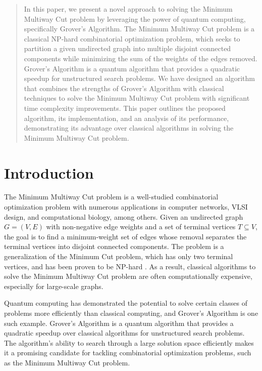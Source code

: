 \begin{abstract}
In this paper, we present a novel approach to solving the Minimum Multiway Cut problem by leveraging the power of quantum computing, specifically Grover's Algorithm. The Minimum Multiway Cut problem is a classical NP-hard combinatorial optimization problem, which seeks to partition a given undirected graph into multiple disjoint connected components while minimizing the sum of the weights of the edges removed. Grover's Algorithm is a quantum algorithm that provides a quadratic speedup for unstructured search problems. We have designed an algorithm that combines the strengths of Grover's Algorithm with classical techniques to solve the Minimum Multiway Cut problem with significant time complexity improvements. This paper outlines the proposed algorithm, its implementation, and an analysis of its performance, demonstrating its advantage over classical algorithms in solving the Minimum Multiway Cut problem.

\end{abstract}

\section{Introduction}
The Minimum Multiway Cut problem is a well-studied combinatorial optimization problem with numerous applications in computer networks, VLSI design, and computational biology, among others. Given an undirected graph $G=(V,E)$ with non-negative edge weights and a set of terminal vertices $T \subseteq V$, the goal is to find a minimum-weight set of edges whose removal separates the terminal vertices into disjoint connected components. The problem is a generalization of the Minimum Cut problem, which has only two terminal vertices, and has been proven to be NP-hard \cite{dahlhaus1994complexity}. As a result, classical algorithms to solve the Minimum Multiway Cut problem are often computationally expensive, especially for large-scale graphs.

Quantum computing has demonstrated the potential to solve certain classes of problems more efficiently than classical computing, and Grover's Algorithm \cite{grover1996fast} is one such example. Grover's Algorithm is a quantum algorithm that provides a quadratic speedup over classical algorithms for unstructured search problems. The algorithm's ability to search through a large solution space efficiently makes it a promising candidate for tackling combinatorial optimization problems, such as the Minimum Multiway Cut problem.

